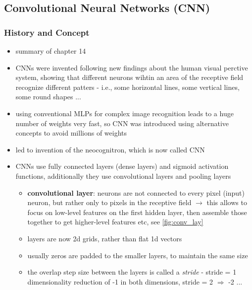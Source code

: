 \documentclass[12pt,a4paper]{article}
\begin{document}



\subsection{Convolutional Neural Networks (CNN)} %
\label{sub:convolutional_neural_networks_}

\subsubsection{History and Concept} %
\label{ssub:history_and_concept}

\begin{itemize}
  \item summary of \cite{geron_hands-machine_2019} chapter 14
  \item CNNs were invented following new findings about the human visual perctive system, showing that different neurons wihtin an area of the receptive field recognize different patters - i.e., some horizontal lines, some vertical lines, some round shapes ...
  \item using conventional MLPs for complex image recognition leads to a huge number of weights very fast, so CNN was introduced using alternative concepts to avoid millions of weights
  \item led to invention of the neocognitron, which is now called CNN
  \item CNNs use fully connected layers (dense layers) and sigmoid activation functions, additionally they use convolutional layers and pooling layers
  \begin{itemize}
    \item \textbf{convolutional layer}: neurons are not connected to every pixel (input) neuron, but rather only to pixels in the receptive field
    \newline \indent $\longrightarrow$ this allows to focus on low-level features on the first hidden layer, then assemble those together to get higher-level features etc, see \ref{fig:conv_lay}
    \item layers are now 2d grids, rather than flat 1d vectors
    \item usually zeros are padded to the smaller layers, to maintain the same size
    \item the overlap step size between the layers is called a \textit{stride} - stride = 1 dimensionality reduction of -1 in both dimensions, stride = 2 $\Longrightarrow$ -2 ...

\end{itemize}
\end{itemize}
\end{document}
